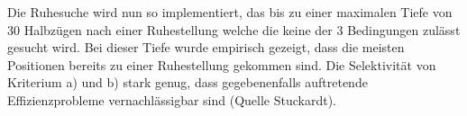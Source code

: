 Die Ruhesuche wird nun so implementiert, das bis zu einer maximalen Tiefe von 30 Halbzügen nach einer Ruhestellung welche die keine der 3 Bedingungen zulässt gesucht wird. Bei dieser Tiefe wurde empirisch gezeigt, dass die meisten Positionen bereits zu einer Ruhestellung gekommen sind. Die Selektivität von Kriterium a) und b) stark genug, dass gegebenenfalls auftretende Effizienzprobleme vernachlässigbar sind (Quelle Stuckardt).